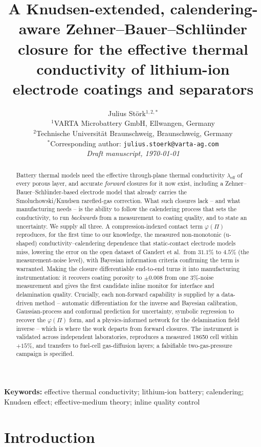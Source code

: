 \documentclass[10pt,a4paper]{article}
\title{\textbf{A Knudsen-extended, calendering-aware Zehner--Bauer--Schl\"under closure for the effective thermal conductivity of lithium-ion electrode coatings and separators}}
\author{Julius St\"ork$^{1,2,\ast}$\\[2pt]
\small $^1$VARTA Microbattery GmbH, Ellwangen, Germany\\
\small $^2$Technische Universit\"at Braunschweig, Braunschweig, Germany\\
\small $^\ast$Corresponding author: \texttt{julius.stoerk@varta-ag.com}\\[2pt]
\small \textit{Draft manuscript, \today}}
\date{}
\newcommand{\leff}{\lambda_{\mathrm{eff}}}
\begin{document}
\maketitle

\begin{abstract}
\noindent
Battery thermal models need the effective through-plane thermal conductivity $\leff$ of every porous layer, and accurate \emph{forward} closures for it now exist, including a Zehner--Bauer--Schl\"under-based electrode model that already carries the Smoluchowski/Knudsen rarefied-gas correction. What such closures lack -- and what manufacturing needs -- is the ability to follow the calendering process that sets the conductivity, to run \emph{backwards} from a measurement to coating quality, and to state an uncertainty. We supply all three. A compression-indexed contact term $\varphi(\Pi)$ reproduces, for the first time to our knowledge, the measured non-monotonic (u-shaped) conductivity--calendering dependence that static-contact electrode models miss, lowering the error on the open dataset of Gandert et al.\ from $31.1\%$ to $4.5\%$ (the measurement-noise level), with Bayesian information criteria confirming the term is warranted. Making the closure differentiable end-to-end turns it into manufacturing instrumentation: it recovers coating porosity to $\pm0.008$ from one $3\%$-noise measurement and gives the first candidate inline monitor for interface and delamination quality. Crucially, each non-forward capability is supplied by a data-driven method -- automatic differentiation for the inverse and Bayesian calibration, Gaussian-process and conformal prediction for uncertainty, symbolic regression to recover the $\varphi(\Pi)$ form, and a physics-informed network for the delamination field inverse -- which is where the work departs from forward closures. The instrument is validated across independent laboratories, reproduces a measured 18650 cell within $+15\%$, and transfers to fuel-cell gas-diffusion layers; a falsifiable two-gas-pressure campaign is specified.
\end{abstract}

\vspace{1ex}
\noindent\textbf{Keywords:} effective thermal conductivity; lithium-ion battery; calendering; Knudsen effect; effective-medium theory; inline quality control

\section{Introduction}
\label{sec:intro}
\end{document}
